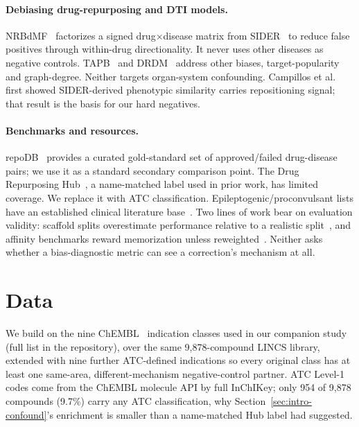 \documentclass{llncs}
\begin{document}
\paragraph{Debiasing drug-repurposing and DTI models.}
NRBdMF~\cite{azuma2022nrbdmf} factorizes a signed drug$\times$disease matrix from SIDER~\cite{kuhn2016sider} to reduce false positives through within-drug directionality. It never uses other diseases as negative controls. TAPB~\cite{tapb2025b} and DRDM~\cite{meng2025drdmb} address other biases, target-popularity and graph-degree. Neither targets organ-system confounding. Campillos et al.~\cite{campillos2008sideeffect,kuhn2010sider} first showed SIDER-derived phenotypic similarity carries repositioning signal; that result is the basis for our hard negatives.

\paragraph{Benchmarks and resources.}
repoDB~\cite{brown2017repodb} provides a curated gold-standard set of approved/failed drug-disease pairs; we use it as a standard secondary comparison point. The Drug Repurposing Hub~\cite{corsello2017repurposinghubb}, a name-matched label used in prior work, has limited coverage. We replace it with ATC classification. Epileptogenic/proconvulsant lists have an established clinical literature base~\cite{ruffmann2006epileptogenic,chen2016druginducedseizures,shorvon2002proconvulsant}. Two lines of work bear on evaluation validity: scaffold splits overestimate performance relative to a realistic split~\cite{scaffoldsplits2024}, and affinity benchmarks reward memorization unless reweighted~\cite{similarityaware2025}. Neither asks whether a bias-diagnostic metric can see a correction's mechanism at all.

\section{Data}
\label{sec:data}
We build on the nine ChEMBL~\cite{zdrazil2024chemblb} indication classes used in our companion study (full list in the repository), over the same 9{,}878-compound LINCS library, extended with nine further ATC-defined indications so every original class has at least one same-area, different-mechanism negative-control partner. ATC Level-1 codes come from the ChEMBL molecule API by full InChIKey; only 954 of 9{,}878 compounds (9.7\%) carry any ATC classification, why Section~\ref{sec:intro-confound}'s enrichment is smaller than a name-matched Hub label had suggested.
\end{document}
